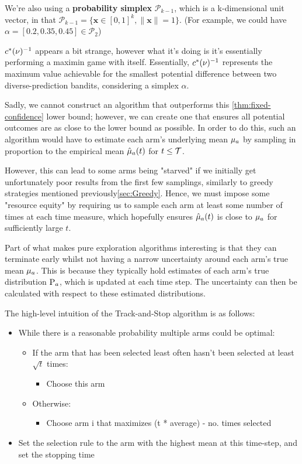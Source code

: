 We're also using a \textbf{probability simplex} $\mathcal{P}_{k-1}$, which is a k-dimensional unit vector, in that $\mathcal{P}_{k-1} = \{ \mathbf{x} \in \left[0, 1 \right]^{k}, \|\mathbf{x}\| = 1
 \}$. (For example, we could have $\alpha = [0.2, 0.35, 0.45] \in \mathcal{P}_{2}$)

$c^*(\nu)^{-1}$ appears a bit strange, however what it's doing is it's essentially performing a maximin game with itself. Essentially, $c^*(\nu)^{-1}$ represents the maximum value achievable for the smallest potential difference between two diverse-prediction bandits, considering a simplex $\alpha$.

Sadly, we cannot construct an algorithm that outperforms this \ref{thm:fixed-confidence} lower bound; however, we can create one that ensures all potential outcomes are as close to the lower bound as possible. In order to do this, such an algorithm would have to estimate each arm's underlying mean $\mu_{a}$ by sampling in proportion to the empirical mean $\hat{\mu}_{a}(t)$ for $t \leq \mathcal{T}$.

However, this can lead to some arms being "starved" if we initially get unfortunately poor results from the first few samplings, similarly to greedy strategies mentioned previously\ref{sec:Greedy}. Hence, we must impose some "resource equity" by requiring us to sample each arm at least some number of times at each time measure, which hopefully ensures $\hat{\mu}_{a}(t)$ is close to $\mu_{a}$ for sufficiently large $t$.


Part of what makes pure exploration algorithms interesting is that they can terminate early whilst not having a narrow uncertainty around each arm's true mean $\mu_{a}$. This is because they typically hold estimates of each arm's true distribution $\mathrm{P}_{a}$, which is updated at each time step. The uncertainty can then be calculated with respect to these estimated distributions. 

The high-level intuition of the Track-and-Stop algorithm is as follows:

\begin{itemize}
    \item While there is a reasonable probability multiple arms could be optimal:
    \begin{itemize}
        \item If the arm that has been selected least often hasn't been selected at least $\sqrt{t}$ times:
        \begin{itemize}
            \item Choose this arm
        \end{itemize}
        \item Otherwise:
        \begin{itemize}
            \item Choose arm i that maximizes (t * average) - no. times selected
        \end{itemize}
    \end{itemize}
    \item Set the selection rule to the arm with the highest mean at this time-step, and set the stopping time
\end{itemize}

